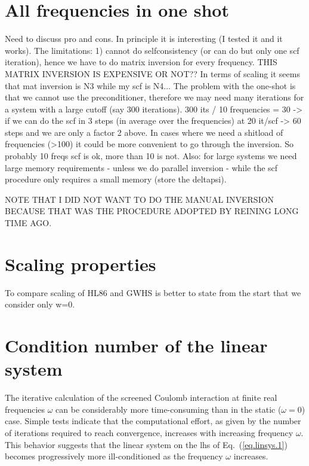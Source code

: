 \documentclass[twocolumn,prb,showpacs,superscriptaddress]{revtex4}
\def\w{\omega}
\begin{document}
\section{All frequencies in one shot}

Need to discuss pro and cons. In principle it is interesting (I tested it and it works).
The limitations: 1) cannot do selfconsistency (or can do but only one scf iteration),
hence we have to do matrix inversion for every frequency.
THIS MATRIX INVERSION IS EXPENSIVE OR NOT??
In terms of scaling it seems that mat inversion is N3 while my scf is N4...
The problem with the one-shot is that we cannot use the preconditioner,
therefore we may need many iterations for a system with a large cutoff
(say 300 iterations). 300 its / 10 frequencies = 30 -> if we can do the
scf in 3 steps (in average over the frequencies) at 20 it/scf -> 60 steps
and we are only a factor 2 above.
In cases where we need a shitload of frequencies (>100) it could be
more convenient to go through the inversion.
So probably 10 freqs scf is ok, more than 10 is not.
Also: for large systems we need large memory requirements - unless we do parallel inversion -
while the scf procedure only requires a small memory (store the deltapsi).

NOTE THAT I DID NOT WANT TO DO THE MANUAL INVERSION BECAUSE THAT
WAS THE PROCEDURE ADOPTED BY REINING LONG TIME AGO.


\section{Scaling properties}

To compare scaling of HL86 and GWHS is better to state from the start that
we consider only w=0.

\section{Condition number of the linear system}

The iterative calculation of the screened Coulomb interaction at finite real
frequencies $\w$ can be considerably more time-consuming than in the static
($\w=0$) case. Simple tests indicate that the computational effort, as given
by the number of iterations required to reach convergence, increases with 
increasing frequency $\w$. This behavior suggests that the linear system 
on the lhs of Eq.\ (\ref{eq.linsys.1}) becomes progressively more ill-conditioned 
as the frequency $\w$ increases.
\end{document}
